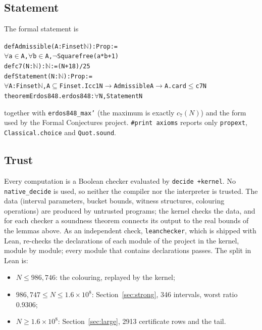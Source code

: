 \documentclass[11pt]{amsart}
\theoremstyle{definition}
\theoremstyle{remark}
\newcommand{\lean}[1]{\texttt{#1}}
\begin{document}
\subsection{Statement}
The formal statement is
\begin{alltt}\small
def Admissible (A : Finset \(\mathbb{N}\)) : Prop :=
  \(\forall\) a \(\in\) A, \(\forall\) b \(\in\) A, \(\neg\) Squarefree (a * b + 1)
def c7 (N : \(\mathbb{N}\)) : \(\mathbb{N}\) := (N + 18) / 25
def Statement (N : \(\mathbb{N}\)) : Prop :=
  \(\forall\) A : Finset \(\mathbb{N}\), A \(\subseteq\) Finset.Icc 1 N \(\to\) Admissible A \(\to\) A.card \(\le\) c7 N
theorem Erdos848.erdos848 : \(\forall\) N, Statement N
\end{alltt}
together with \lean{erdos848\_max'} (the maximum is exactly $c_7(N)$) and the form
used by the Formal Conjectures project. \lean{\#print axioms} reports only
\lean{propext}, \lean{Classical.choice} and \lean{Quot.sound}.

\subsection{Trust}
Every computation is a Boolean checker evaluated by \lean{decide +kernel}. No
\lean{native\_decide} is used, so neither the compiler nor the interpreter is
trusted. The data (interval parameters, bucket bounds, witness structures, colouring
operations) are produced by untrusted programs; the kernel checks the data, and for
each checker a soundness theorem connects its output to the real bounds of the
lemmas above. As an independent check, \lean{leanchecker}, which is shipped with
Lean, re-checks the declarations of each module of the project in the kernel,
module by module; every module that contains declarations passes. The split in Lean is:
\begin{itemize}[leftmargin=*]
\item $N\le986{,}746$: the colouring, replayed by the kernel;
\item $986{,}747\le N\le1.6\times10^8$: Section~\ref{sec:strong}, 346 intervals,
  worst ratio $0.9306$;
\item $N\ge1.6\times10^8$: Section~\ref{sec:large}, 2913 certificate rows and the tail.
\end{itemize}
\end{document}
